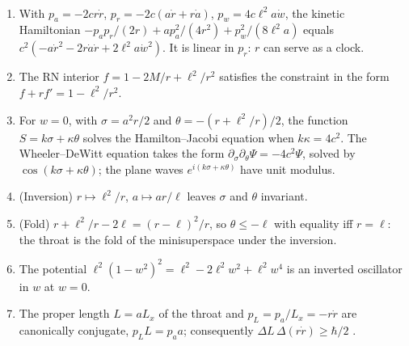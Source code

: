 \begin{theorem}\label{thm:ks}\ver\
\begin{enumerate}[label=(\roman*)]
\item With $p_a=-2cr\dot r$, $p_r=-2c(a\dot r+r\dot a)$, $p_w=4c\ell^2a\dot w$, the kinetic Hamiltonian $-p_ap_r/(2r)+ap_a^2/(4r^2)+p_w^2/(8\ell^2a)$ equals $c^2(-a\dot r^2-2r\dot a\dot r+2\ell^2a\dot w^2)$. It is linear in $p_r$: $r$ can serve as a clock.
\item The RN interior $f=1-2M/r+\ell^2/r^2$ satisfies the constraint in the form $f+rf'=1-\ell^2/r^2$.
\item For $w=0$, with $\sigma=a^2r/2$ and $\theta=-(r+\ell^2/r)/2$, the function $S=k\sigma+\kappa\theta$ solves the Hamilton--Jacobi equation when $k\kappa=4c^2$. The Wheeler--DeWitt equation takes the form $\partial_\sigma\partial_\theta\Psi=-4c^2\Psi$, solved by $\cos(k\sigma+\kappa\theta)$; the plane waves $e^{i(k\sigma+\kappa\theta)}$ have unit modulus.
\item (Inversion) $r\mapsto\ell^2/r$, $a\mapsto ar/\ell$ leaves $\sigma$ and $\theta$ invariant.
\item (Fold) $r+\ell^2/r-2\ell=(r-\ell)^2/r$, so $\theta\le-\ell$ with equality iff $r=\ell$: the throat is the fold of the minisuperspace under the inversion.
\item The potential $\ell^2(1-w^2)^2=\ell^2-2\ell^2w^2+\ell^2w^4$ is an inverted oscillator in $w$ at $w=0$.
\item The proper length $L=aL_x$ of the throat and $p_L=p_a/L_x=-r\dot r$ are canonically conjugate, $p_LL=p_aa$; consequently $\Delta L\,\Delta(r\dot r)\ge\hbar/2$ \ext.
\end{enumerate}
\end{theorem}
